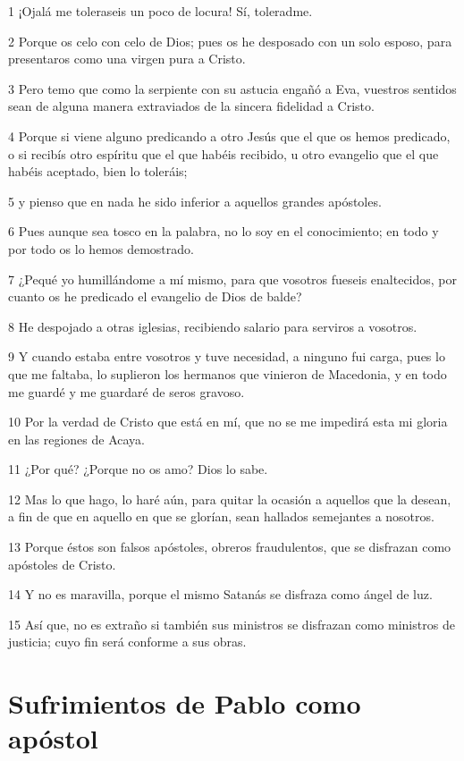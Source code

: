 \par 1 ¡Ojalá me toleraseis un poco de locura! Sí, toleradme.
\par 2 Porque os celo con celo de Dios; pues os he desposado con un solo esposo, para presentaros como una virgen pura a Cristo.
\par 3 Pero temo que como la serpiente con su astucia engañó a Eva, vuestros sentidos sean de alguna manera extraviados de la sincera fidelidad a Cristo.
\par 4 Porque si viene alguno predicando a otro Jesús que el que os hemos predicado, o si recibís otro espíritu que el que habéis recibido, u otro evangelio que el que habéis aceptado, bien lo toleráis;
\par 5 y pienso que en nada he sido inferior a aquellos grandes apóstoles.
\par 6 Pues aunque sea tosco en la palabra, no lo soy en el conocimiento; en todo y por todo os lo hemos demostrado.
\par 7 ¿Pequé yo humillándome a mí mismo, para que vosotros fueseis enaltecidos, por cuanto os he predicado el evangelio de Dios de balde?
\par 8 He despojado a otras iglesias, recibiendo salario para serviros a vosotros.
\par 9 Y cuando estaba entre vosotros y tuve necesidad, a ninguno fui carga, pues lo que me faltaba, lo suplieron los hermanos que vinieron de Macedonia, y en todo me guardé y me guardaré de seros gravoso.
\par 10 Por la verdad de Cristo que está en mí, que no se me impedirá esta mi gloria en las regiones de Acaya.
\par 11 ¿Por qué? ¿Porque no os amo? Dios lo sabe.
\par 12 Mas lo que hago, lo haré aún, para quitar la ocasión a aquellos que la desean, a fin de que en aquello en que se glorían, sean hallados semejantes a nosotros.
\par 13 Porque éstos son falsos apóstoles, obreros fraudulentos, que se disfrazan como apóstoles de Cristo.
\par 14 Y no es maravilla, porque el mismo Satanás se disfraza como ángel de luz.
\par 15 Así que, no es extraño si también sus ministros se disfrazan como ministros de justicia; cuyo fin será conforme a sus obras.

\section*{Sufrimientos de Pablo como apóstol}

